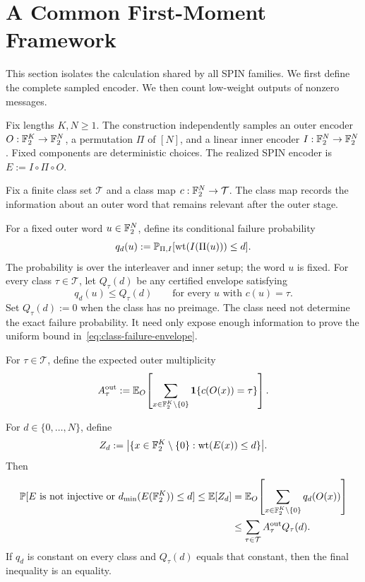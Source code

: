 \section{A Common First-Moment Framework}
\label{sec:framework}

This section isolates the calculation shared by all SPIN families. We first
define the complete sampled encoder. We then count low-weight outputs of
nonzero messages.

Fix lengths $K,N\ge1$. The construction independently samples an outer
encoder $O:\mathbb F_2^K\to\mathbb F_2^N$, a permutation $\Pi$ of $[N]$, and a linear
inner encoder $I:\mathbb F_2^N\to\mathbb F_2^N$. Fixed components are deterministic
choices. The realized SPIN encoder is $E:=I\circ\Pi\circ O$.

Fix a finite class set $\mathcal T$ and a class map
$c:\mathbb F_2^N\to\mathcal T$. The class map records the information about an
outer word that remains relevant after the outer stage.

For a fixed outer word $u\in\mathbb F_2^N$, define its conditional failure
probability
\begin{equation}
  q_d(u)
  :=
  \mathbb P_{\Pi,I}[\operatorname{wt}(I(\Pi(u)))\le d].
  \label{eq:conditional-inner-failure}
\end{equation}
The probability is over the interleaver and inner setup; the word $u$ is
fixed. For every class $\tau\in\mathcal T$, let $Q_\tau(d)$ be any certified
envelope satisfying
\begin{equation}
  q_d(u)\le Q_\tau(d)
  \qquad\text{for every $u$ with $c(u)=\tau$}.
  \label{eq:class-failure-envelope}
\end{equation}
Set $Q_\tau(d):=0$ when the class has no preimage. The class need not determine
the exact failure probability. It need only expose enough information to prove
the uniform bound in~\eqref{eq:class-failure-envelope}.

For $\tau\in\mathcal T$, define the expected outer multiplicity
\begin{equation}
  A_\tau^{\mathrm{out}}
  :=
  \mathbb E_O\!\left[
    \sum_{x\in\mathbb F_2^K\setminus\{0\}}
    \mathbf 1\{c(O(x))=\tau\}
  \right].
  \label{eq:outer-class-multiplicity}
\end{equation}

\begin{theorem}
\label{thm:class-first-moment}
For $d\in\{0,\ldots,N\}$, define
\[
  Z_d
  :=
  \bigl|\{x\in\mathbb F_2^K\setminus\{0\}:
  \operatorname{wt}(E(x))\le d\}\bigr|.
\]
Then
\begin{equation}
\begin{split}
  \mathbb P[E\text{ is not injective or }d_{\min}(E(\mathbb F_2^K))\le d]
  \le
  \mathbb E[Z_d]
  &=
  \mathbb E_O\!\left[
    \sum_{x\in\mathbb F_2^K\setminus\{0\}}q_d(O(x))
  \right]\\
  &\le
  \sum_{\tau\in\mathcal T}
  A_\tau^{\mathrm{out}}Q_\tau(d).
\end{split}
  \label{eq:class-first-moment}
\end{equation}
If $q_d$ is constant on every class and $Q_\tau(d)$ equals that constant,
then the final inequality is an equality.
\end{theorem}

